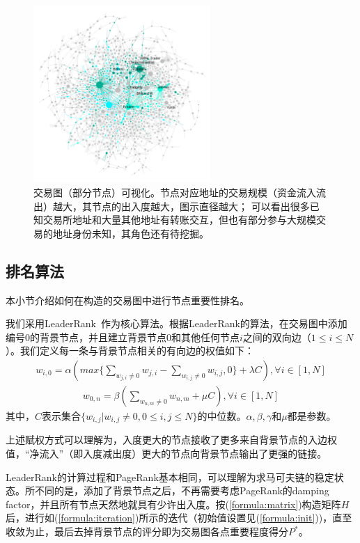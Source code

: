 \begin{figure}[!htbp]
	\centering
	\includegraphics[width=0.6\textwidth]{figs/wgc1.png}
  \caption{交易图（部分节点）可视化。\small{节点对应地址的交易规模（资金流入流出）越大，其节点的出入度越大，图示直径越大；
      可以看出很多已知交易所地址和大量其他地址有转账交互，但也有部分参与大规模交易的地址身份未知，其角色还有待挖掘。}}\label{fig:wgc}
\end{figure}

\subsection{排名算法} \label{subsec:leaderrank}
本小节介绍如何在构造的交易图中进行节点重要性排名。

我们采用LeaderRank~\cite{Chen2013}\cite{Li2014}作为核心算法。根据LeaderRank的算法，在交易图中添加编号$0$的背景节点，并且建立背景节点$0$和其他任何节点$i$之间的双向边（$1\leq i \leq N$）。我们定义每一条与背景节点相关的有向边的权值如下：
\begin{align}\label{formula:weight1}
w_{i,0} = \alpha( max\{ \sum_{w_{j,i} \neq 0} w_{j,i} - \sum_{w_{i,j} \neq 0} w_{i,j} , 0\} + \lambda C ), \forall i \in [1,N]	
\end{align}
\begin{align}\label{formula:weight2} 
w_{0,n}	= \beta ( \sum_{w_{n,m} \neq 0} w_{n,m} + \mu C), \forall i \in [1,N]
\end{align}
其中，$C$表示集合$\{w_{i,j} | w_{i,j} \neq 0, 0\leq i,j \leq N\}$的中位数。$\alpha, \beta, \gamma$和$\mu$都是参数。

上述赋权方式可以理解为，入度更大的节点接收了更多来自背景节点的入边权值，“净流入”（即入度减出度）更大的节点向背景节点输出了更强的链接。

LeaderRank的计算过程和PageRank基本相同，可以理解为求马可夫链的稳定状态。所不同的是，添加了背景节点之后，不再需要考虑PageRank的damping factor\cite{Brin2010}\cite{page1999pagerank}，并且所有节点天然地就具有少许出入度。按(\ref{formula:matrix})构造矩阵$H$后，进行如(\ref{formula:iteration})所示的迭代（初始值设置见(\ref{formula:init}))，直至收敛为止，最后去掉背景节点的评分即为交易图各点重要程度得分$P^*$。

